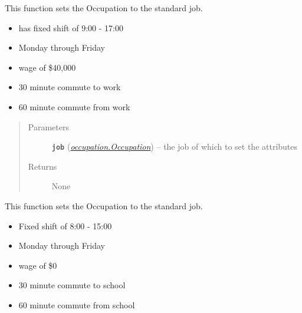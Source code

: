 \documentclass[letterpaper,10pt,english]{sphinxmanual}
\begin{document}
\begin{fulllineitems}
\begin{fulllineitems}
\label{occupation:occupation.Occupation.set_standard_job}
This function sets the Occupation to the standard job.
\begin{itemize}
\item {} 
has fixed shift of 9:00 - 17:00

\item {} 
Monday through Friday

\item {} 
wage of \$40,000

\item {} 
30 minute commute to work

\item {} 
60 minute commute from work

\end{itemize}
\begin{quote}\begin{description}
\item[{Parameters}] \leavevmode
\textbf{\texttt{job}} ({\hyperref[occupation:occupation.Occupation]{\emph{\emph{occupation.Occupation}}}}) -- the job of which to set the attributes

\item[{Returns}] \leavevmode
None

\end{description}\end{quote}

\end{fulllineitems}


\begin{fulllineitems}
\label{occupation:occupation.Occupation.set_student}
This function sets the Occupation to the standard job.
\begin{itemize}
\item {} 
Fixed shift of 8:00 - 15:00

\item {} 
Monday through Friday

\item {} 
wage of \$0

\item {} 
30 minute commute to school

\item {} 
60 minute commute from school


\end{itemize}
\end{fulllineitems}
\end{fulllineitems}
\end{document}
